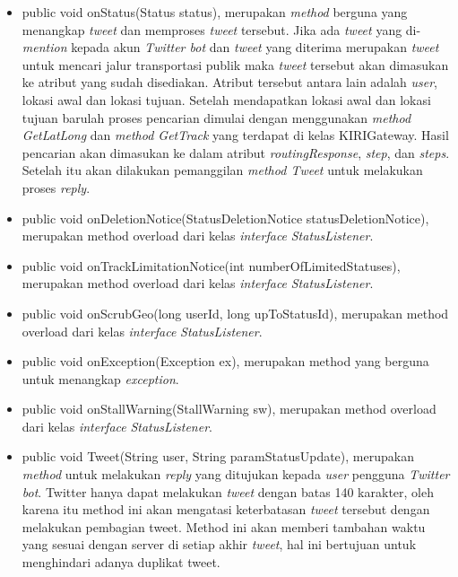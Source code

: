 \begin{itemize}
\begin{itemize}
									\begin{itemize}
												\item public void onStatus(Status status), merupakan \textit{method} berguna yang menangkap \textit{tweet} dan memproses \textit{tweet} tersebut. Jika ada \textit{tweet} yang di-\textit{mention} kepada akun \textit{Twitter bot} dan \textit{tweet} yang diterima merupakan \textit{tweet} untuk mencari jalur transportasi publik maka \textit{tweet} tersebut akan dimasukan ke atribut yang sudah disediakan. Atribut tersebut antara lain adalah \textit{user}, lokasi awal dan lokasi tujuan. Setelah mendapatkan lokasi awal dan lokasi tujuan barulah proses pencarian dimulai dengan menggunakan \textit{method GetLatLong} dan \textit{method GetTrack} yang terdapat di kelas KIRIGateway. Hasil pencarian akan dimasukan ke dalam atribut \textit{routingResponse}, \textit{step}, dan \textit{steps}. Setelah itu akan dilakukan pemanggilan \textit{method Tweet} untuk melakukan proses \textit{reply}.
												\item public void onDeletionNotice(StatusDeletionNotice statusDeletionNotice), merupakan method overload dari kelas \textit{interface} \textit{StatusListener}.
												\item public void onTrackLimitationNotice(int numberOfLimitedStatuses), merupakan method overload dari kelas \textit{interface} \textit{StatusListener}.
												\item public void onScrubGeo(long userId, long upToStatusId), merupakan method overload dari kelas \textit{interface} \textit{StatusListener}.
												\item public void onException(Exception ex), merupakan method yang berguna untuk menangkap \textit{exception}.
												\item public void onStallWarning(StallWarning sw), merupakan method overload dari kelas \textit{interface} \textit{StatusListener}.
												\item public void Tweet(String user, String paramStatusUpdate), merupakan \textit{method} untuk melakukan \textit{reply} yang ditujukan kepada \textit{user} pengguna \textit{Twitter bot}. Twitter hanya dapat melakukan \textit{tweet} dengan batas 140 karakter, oleh karena itu method ini akan mengatasi keterbatasan \textit{tweet} tersebut dengan melakukan pembagian tweet. Method ini akan memberi tambahan waktu yang sesuai dengan server di setiap akhir \textit{tweet}, hal ini bertujuan untuk menghindari adanya duplikat tweet.
									\end{itemize}
				\end{itemize}
		

\end{itemize}
